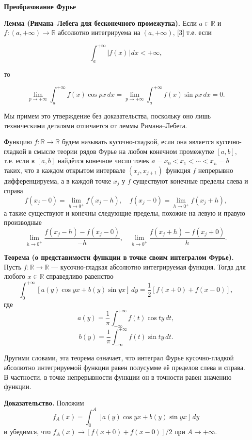 \textbf{Преобразование Фурье}{




\textbf{Лемма (Римана–Лебега для бесконечного промежутка).} Если \( a \in \mathbb{R} \) и \( f: (a, +\infty) \to \mathbb{R} \) абсолютно интегрируема на \((a, +\infty)\), [3] т.е. если

\[
\int_{a}^{+\infty} |f(x)| \, dx < +\infty, \tag{1.24}
\]

то

\[
\lim_{p \to +\infty} \int_{a}^{+\infty} f(x) \cos px \, dx = \lim_{p \to +\infty} \int_{a}^{+\infty} f(x) \sin px \, dx = 0. \tag{1.25}
\]

Мы примем это утверждение без доказательства, поскольку оно лишь техническими деталями отличается от леммы Римана–Лебега.




Функцию \( f: \mathbb{R} \to \mathbb{R} \) будем называть кусочно-гладкой, если она является кусочно-гладкой в смысле теории рядов Фурье на любом конечном промежутке \([a, b]\), т.е. если в \([a, b]\) найдётся конечное число точек \( a = x_0 < x_1 < \cdots < x_n = b \) таких, что в каждом открытом интервале \((x_j, x_{j+1})\) функция \( f \) непрерывно дифференцируема, а в каждой точке \( x_j \) у \( f \) существуют конечные пределы слева и справа
\[
f(x_j - 0) = \lim_{h \to 0^+} f(x_j - h), \quad f(x_j + 0) = \lim_{h \to 0^+} f(x_j + h), \tag{1.26}
\]
а также существуют и конечны следующие пределы, похожие на левую и правую производные
\[
\lim_{h \to 0^+} \frac{f(x_j - h) - f(x_j - 0)}{-h}, \quad \lim_{h \to 0^+} \frac{f(x_j + h) - f(x_j + 0)}{h}. \tag{1.27}
\]

\textbf{Теорема (о представимости функции в точке своим интегралом Фурье).} Пусть \( f: \mathbb{R} \to \mathbb{R} \) — кусочно-гладкая абсолютно интегрируемая функция. Тогда для любого \( x \in \mathbb{R} \) справедливо равенство
\[
\int_0^{+\infty} [a(y) \cos yx + b(y) \sin yx] \, dy = \frac{1}{2} [f(x + 0) + f(x - 0)], \tag{1.28}
\]
где
\[
a(y) = \frac{1}{\pi} \int_{-\infty}^{+\infty} f(t) \cos ty \, dt, \tag{1.29}
\]
\[
b(y) = \frac{1}{\pi} \int_{-\infty}^{+\infty} f(t) \sin ty \, dt. \tag{1.30}
\]

Другими словами, эта теорема означает, что интеграл Фурье кусочно-гладкой абсолютно интегрируемой функции равен полусумме её пределов слева и справа. В частности, в точке непрерывности функции он в точности равен значению функции.

\textbf{Доказательство.} Положим
\[
f_A(x) = \int_0^A [a(y) \cos yx + b(y) \sin yx] \, dy \tag{1.31}
\]
и убедимся, что \( f_A(x) \to [f(x + 0) + f(x - 0)]/2 \) при \( A \to +\infty \). 



}
